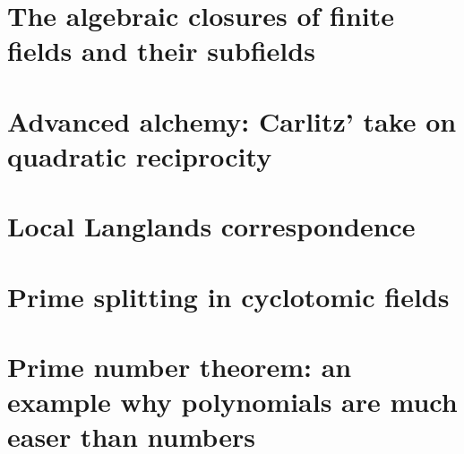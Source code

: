 \documentclass[a4paper]{memoir}
\begin{document}
\section{The algebraic closures of finite fields and their subfields}


\section{Advanced alchemy: Carlitz' take on quadratic reciprocity}


\section{Local Langlands correspondence}


\section{Prime splitting in cyclotomic fields}


\section{Prime number theorem: an example why polynomials are much easer than numbers}




\end{document}

